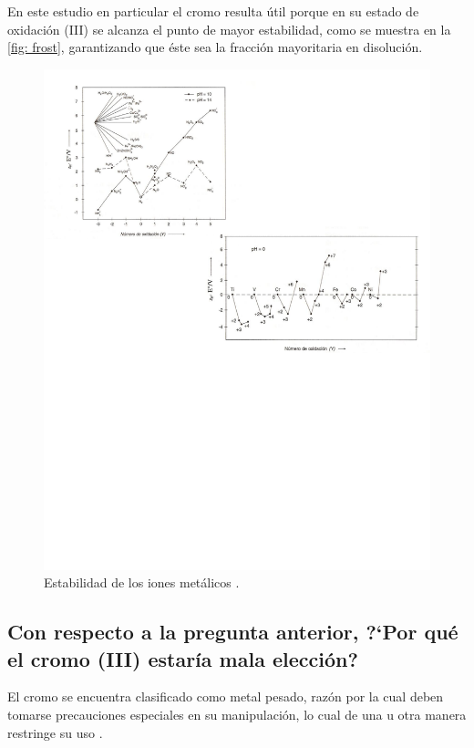 \documentclass[fleqn,10pt]{SelfArx} %
\begin{document}
	En este estudio en particular el cromo resulta \'util porque en su estado de oxidaci\'on (III) se alcanza el punto de mayor estabilidad, como se muestra en la \autoref{fig: frost}, garantizando que \'este sea la fracci\'on mayoritaria en disoluci\'on.
	\begin{figure}[h]
	    \centering
	    \includegraphics[width=\linewidth]{images/frost.pdf}
	    \caption{Estabilidad de los iones met\'alicos \cite{Frost}.}
	    \label{fig: frost}
	\end{figure}
	
	\subsection[Con respecto]{Con respecto a la pregunta anterior, ?`Por qu\'e el cromo (III) estar\'ia mala elecci\'on?}
	El cromo se encuentra clasificado como metal pesado, raz\'on por la cual deben tomarse precauciones especiales en su manipulaci\'on, lo cual de una u otra manera restringe su uso \cite{Frost}.
	
\end{document}
